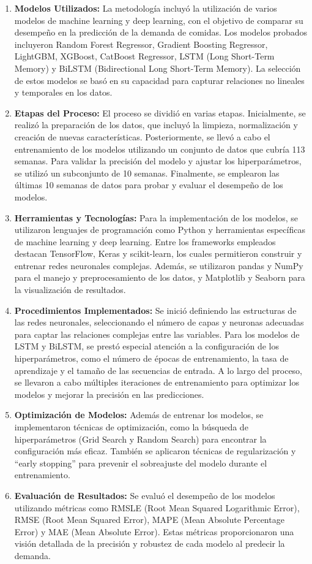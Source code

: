 \begin{enumerate}
\item \textbf{Modelos Utilizados:} La metodología incluyó la utilización de varios modelos de machine learning y deep learning, con el objetivo de comparar su desempeño en la predicción de la demanda de comidas. Los modelos probados incluyeron Random Forest Regressor, Gradient Boosting Regressor, LightGBM, XGBoost, CatBoost Regressor, LSTM (Long Short-Term Memory) y BiLSTM (Bidirectional Long Short-Term Memory). La selección de estos modelos se basó en su capacidad para capturar relaciones no lineales y temporales en los datos.
\item \textbf{Etapas del Proceso:} El proceso se dividió en varias etapas. Inicialmente, se realizó la preparación de los datos, que incluyó la limpieza, normalización y creación de nuevas características. Posteriormente, se llevó a cabo el entrenamiento de los modelos utilizando un conjunto de datos que cubría 113 semanas. Para validar la precisión del modelo y ajustar los hiperparámetros, se utilizó un subconjunto de 10 semanas. Finalmente, se emplearon las últimas 10 semanas de datos para probar y evaluar el desempeño de los modelos.
\item \textbf{Herramientas y Tecnologías:} Para la implementación de los modelos, se utilizaron lenguajes de programación como Python y herramientas específicas de machine learning y deep learning. Entre los frameworks empleados destacan TensorFlow, Keras y scikit-learn, los cuales permitieron construir y entrenar redes neuronales complejas. Además, se utilizaron pandas y NumPy para el manejo y preprocesamiento de los datos, y Matplotlib y Seaborn para la visualización de resultados.
\item \textbf{Procedimientos Implementados:} Se inició definiendo las estructuras de las redes neuronales, seleccionando el número de capas y neuronas adecuadas para captar las relaciones complejas entre las variables. Para los modelos de LSTM y BiLSTM, se prestó especial atención a la configuración de los hiperparámetros, como el número de épocas de entrenamiento, la tasa de aprendizaje y el tamaño de las secuencias de entrada. A lo largo del proceso, se llevaron a cabo múltiples iteraciones de entrenamiento para optimizar los modelos y mejorar la precisión en las predicciones.
\item \textbf{Optimización de Modelos:} Además de entrenar los modelos, se implementaron técnicas de optimización, como la búsqueda de hiperparámetros (Grid Search y Random Search) para encontrar la configuración más eficaz. También se aplicaron técnicas de regularización y ``early stopping''
 para prevenir el sobreajuste del modelo durante el entrenamiento.
\item \textbf{Evaluación de Resultados:} Se evaluó el desempeño de los modelos utilizando métricas como RMSLE (Root Mean Squared Logarithmic Error), RMSE (Root Mean Squared Error), MAPE (Mean Absolute Percentage Error) y MAE (Mean Absolute Error). Estas métricas proporcionaron una visión detallada de la precisión y robustez de cada modelo al predecir la demanda.
\end{enumerate}

